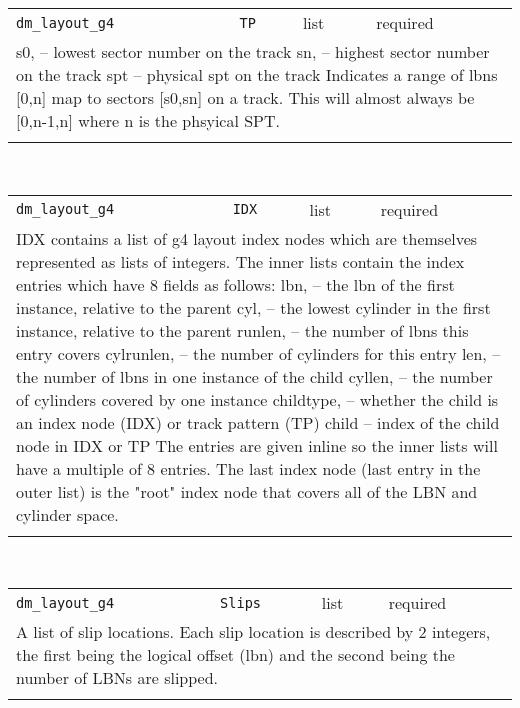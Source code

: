 \noindent 
\begin{tabular}{|p{\lpmodwidth}|p{\lpnamewidth}|p{0.5in}|p{0.5in}|}
\cline{1-4}
\texttt{dm\_layout\_g4} & \texttt{TP} & list & required \\ 
\cline{1-4}
\multicolumn{4}{|p{6in}|}{
s0, -- lowest sector number on the track
sn, -- highest sector number on the track
spt -- physical spt on the track
Indicates a range of lbns [0,n] map to sectors [s0,sn] on a track.
This will almost always be [0,n-1,n] where n is the phsyical SPT.
}\\ 
\cline{1-4}
\multicolumn{4}{p{5in}}{}\\
\end{tabular}\\ 
\noindent 
\begin{tabular}{|p{\lpmodwidth}|p{\lpnamewidth}|p{0.5in}|p{0.5in}|}
\cline{1-4}
\texttt{dm\_layout\_g4} & \texttt{IDX} & list & required \\ 
\cline{1-4}
\multicolumn{4}{|p{6in}|}{
IDX contains a list of g4 layout index nodes which are themselves
represented as lists of integers. The inner lists contain the index
entries which have 8 fields as follows:
lbn, -- the lbn of the first instance, relative to the parent
cyl, -- the lowest cylinder in the first instance, relative to the parent
runlen, -- the number of lbns this entry covers
cylrunlen, -- the number of cylinders for this entry
len, -- the number of lbns in one instance of the child
cyllen, -- the number of cylinders covered by one instance
childtype, -- whether the child is an index node (IDX) or track pattern (TP)
child -- index of the child node in IDX or TP
The entries are given inline so the inner lists will have a multiple
of 8 entries.
The last index node (last entry in the outer list) is the "root" index
node that covers all of the LBN and cylinder space.
}\\ 
\cline{1-4}
\multicolumn{4}{p{5in}}{}\\
\end{tabular}\\ 
\noindent 
\begin{tabular}{|p{\lpmodwidth}|p{\lpnamewidth}|p{0.5in}|p{0.5in}|}
\cline{1-4}
\texttt{dm\_layout\_g4} & \texttt{Slips} & list & required \\ 
\cline{1-4}
\multicolumn{4}{|p{6in}|}{
A list of slip locations. Each slip location is described by 2
integers, the first being the logical offset (lbn) and the second
being the number of LBNs are slipped.
}\\ 
\cline{1-4}
\multicolumn{4}{p{5in}}{}\\
\end{tabular}\\ 
